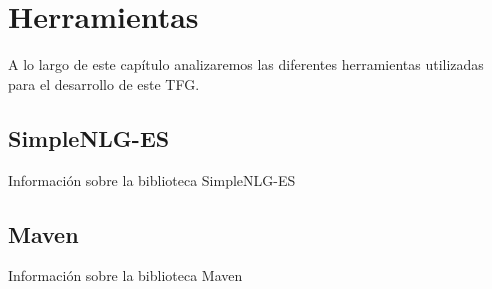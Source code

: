 
\chapter{Herramientas}
\label{cap:Herramientas}


\begin{resumen}
	A lo largo de este capítulo analizaremos las diferentes herramientas utilizadas para el desarrollo de este TFG.

\end{resumen}


\section{SimpleNLG-ES}
\label{cap3:sec:SimpleNLG-ES}
Información sobre la biblioteca SimpleNLG-ES




\section{Maven}
\label{cap3:sec:Maven}
Información sobre la biblioteca Maven

